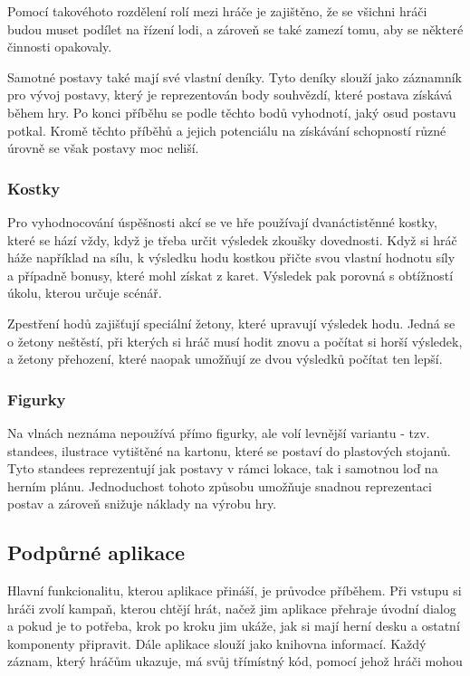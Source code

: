 Pomocí takovéhoto rozdělení rolí mezi hráče je zajištěno, že se všichni hráči budou muset podílet na řízení lodi, a zároveň se také zamezí tomu, aby se některé činnosti opakovaly.

Samotné postavy také mají své vlastní deníky. Tyto deníky slouží jako záznamník pro vývoj postavy, který je reprezentován body souhvězdí, které postava získává během hry. Po konci příběhu se podle těchto bodů vyhodnotí, jaký osud postavu potkal. Kromě těchto příběhů a jejich potenciálu na získávání schopností různé úrovně se však postavy moc neliší.

\subsubsection*{Kostky}
\label{subsubsec:fw_comp_dice}

Pro vyhodnocování úspěšnosti akcí se ve hře používají dvanáctistěnné kostky, které se hází vždy, když je třeba určit výsledek zkoušky dovednosti. Když si hráč háže například na sílu, k výsledku hodu kostkou přičte svou vlastní hodnotu síly a případně bonusy, které mohl získat z karet. Výsledek pak porovná s obtížností úkolu, kterou určuje scénář.

Zpestření hodů zajišťují speciální žetony, které upravují výsledek hodu. Jedná se o žetony neštěstí, při kterých si hráč musí hodit znovu a počítat si horší výsledek, a žetony přehození, které naopak umožňují ze dvou výsledků počítat ten lepší. 

\subsubsection*{Figurky}
\label{subsubsec:fw_comp_figures}

Na vlnách neznáma nepoužívá přímo figurky, ale volí levnější variantu - tzv. standees, ilustrace vytištěné na kartonu, které se postaví do plastových stojanů. Tyto standees reprezentují jak postavy v rámci lokace, tak i samotnou loď na herním plánu. Jednoduchost tohoto způsobu umožňuje snadnou reprezentaci postav a zároveň snižuje náklady na výrobu hry.


\subsection{Podpůrné aplikace}
\label{subsec:fw_apps}

Hlavní funkcionalitu, kterou aplikace přináší, je průvodce příběhem. Při vstupu si hráči zvolí kampaň, kterou chtějí hrát, načež jim aplikace přehraje úvodní dialog a pokud je to potřeba, krok po kroku jim ukáže, jak si mají herní desku a ostatní komponenty připravit. Dále aplikace slouží jako knihovna informací. Každý záznam, který hráčům ukazuje, má svůj třímístný kód, pomocí jehož hráči mohou 

